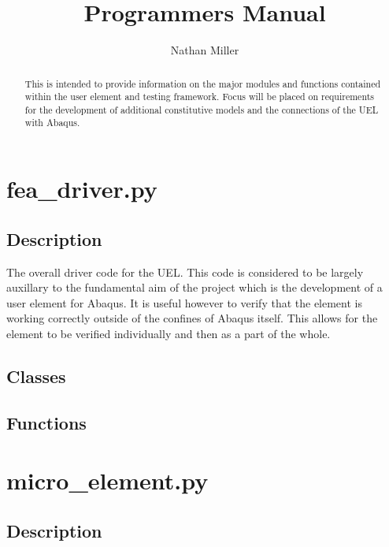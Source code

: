 \documentclass{asme2ej}
\begin{document}
\title{Programmers Manual}
\author{Nathan Miller}

\maketitle

\begin{abstract}

This is intended to provide information on the major modules and functions contained within the user element and testing framework. Focus will be placed on requirements for the development of additional constitutive models and the connections of the UEL with Abaqus.

\end{abstract}

\tableofcontents

\section{fea\_driver.py}

\subsection{Description}

The overall driver code for the UEL. This code is considered to be largely auxillary to the fundamental aim of the project which is the development of a user element for Abaqus. It is useful however to verify that the element is working correctly outside of the confines of Abaqus itself. This allows for the element to be verified individually and then as a part of the whole.

\subsection{Classes}

\subsection{Functions}

\section{micro\_element.py}

\subsection{Description}
\end{document}
